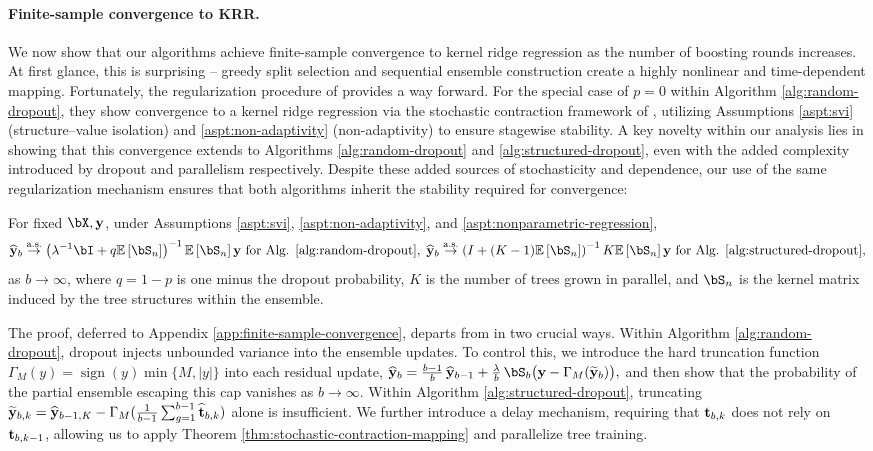 \paragraph{Finite-sample convergence to KRR.} We now show that our algorithms achieve finite-sample convergence to kernel ridge regression as the number of boosting rounds increases. At first glance, this is surprising -- greedy split selection and sequential ensemble construction create a highly nonlinear and time-dependent mapping. Fortunately, the regularization procedure of \cite{zhou2022boulevard} provides a way forward. 
For the special case of $p=0$ within Algorithm \ref{alg:random-dropout}, they show convergence to a kernel ridge regression via the stochastic contraction framework of \cite{almudevar2022stochasticcontractionmappingtheorem}, utilizing Assumptions \ref{aspt:svi} (structure--value isolation) and \ref{aspt:non-adaptivity} (non-adaptivity) to ensure stagewise stability. 
A key novelty within our analysis lies in showing that this convergence extends to Algorithms \ref{alg:random-dropout} and \ref{alg:structured-dropout}, even with the added complexity introduced by dropout and parallelism respectively. Despite these added sources of stochasticity and dependence, our use of the same regularization mechanism ensures that both algorithms inherit the stability required for convergence:
\begin{thm}
\label{thm:krrconv}
For fixed $\bX, \by$, under Assumptions \ref{aspt:svi}, \ref{aspt:non-adaptivity}, and \ref{aspt:nonparametric-regression},
$$\widehat{\by}_b \stackrel{\text{a.s.}}{\to} \left(\lambda^{-1} \bI+q \mathbb{E}\left[\bS_n\right]\right)^{-1} \mathbb{E}\left[\bS_n\right] \by \text{ for Alg. \ref{alg:random-dropout}},
\;
\widehat{\by}_b \stackrel{\text{a.s.}}{\to} \left(I+(K-1)\mathbb{E}\left[\bS_n\right]\right)^{-1} K\mathbb{E}\left[\bS_n\right] \by \text{ for Alg. \ref{alg:structured-dropout}},$$
as $b \to \infty$, where $q=1-p$ is one minus the dropout probability, $K$ is the number of trees grown in parallel, and $\bS_n$ is the kernel matrix induced by the tree structures within the ensemble.
\end{thm}
The proof, deferred to Appendix \ref{app:finite-sample-convergence}, departs from \cite{zhou2022boulevard} in two crucial ways. Within Algorithm \ref{alg:random-dropout}, dropout injects unbounded variance into the ensemble updates. To control this, we introduce the hard truncation function $\Gamma_M(y) = \operatorname{sign}(y)\min\{M,|y|\}$ into each residual update,
$
  \widehat{\by}_b 
    = \frac{b-1}{b}\,\widehat{\by}_{b-1}
    + \frac{\lambda}{b}\,\bS_b\bigl(\by - \Gamma_M(\widetilde{\by}_b)\bigr),
$
and then show that the probability of the partial ensemble escaping this cap vanishes as $b\to\infty$. Within Algorithm \ref{alg:structured-dropout}, truncating $\widetilde{\mathbf{y}}_{b,k}=\widehat{\mathbf{y}}_{b-1,K}-\Gamma_M(\frac{1}{b-1}\sum_{g=1}^{b-1}\widehat{\mathbf{t}}_{b,k})$ alone is insufficient. We further introduce a delay mechanism, requiring that $\mathbf{t}_{b,k}$ does not rely on $\mathbf{t}_{b,k-1}$, allowing us to apply Theorem  \ref{thm:stochastic-contraction-mapping} and parallelize tree training. 

